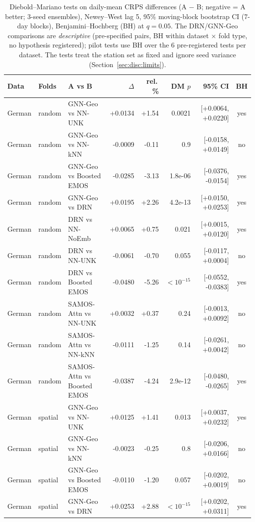 \begin{table}[!htbp]
\centering
\caption{Diebold--Mariano tests on daily-mean CRPS differences (A $-$ B; negative = A better; 3-seed ensembles), Newey--West lag 5, 95\% moving-block bootstrap CI (7-day blocks), Benjamini--Hochberg (BH) at $q=0.05$. The DRN/GNN-Geo comparisons are \emph{descriptive} (pre-specified pairs, BH within dataset $\times$ fold type, no hypothesis registered); pilot tests use BH over the 6 pre-registered tests per dataset. The tests treat the station set as fixed and ignore seed variance (Section~\ref{sec:disc:limits}).}
\label{tab:tests}
\scriptsize
\begin{tabular}{lllrrrrc}
\toprule
Data & Folds & A vs B & $\Delta$ & rel.\,\% & DM $p$ & 95\% CI & BH \\
\midrule
German & random & GNN-Geo vs NN-UNK & +0.0134 & +1.54 & 0.0021 & [+0.0064, +0.0220] & yes \\
German & random & GNN-Geo vs NN-kNN & -0.0009 & -0.11 & 0.9 & [-0.0158, +0.0149] & no \\
German & random & GNN-Geo vs Boosted EMOS & -0.0285 & -3.13 & 1.8e-06 & [-0.0376, -0.0154] & yes \\
German & random & GNN-Geo vs DRN & +0.0195 & +2.26 & 4.2e-13 & [+0.0150, +0.0253] & yes \\
German & random & DRN vs NN-NoEmb & +0.0065 & +0.75 & 0.021 & [+0.0015, +0.0120] & yes \\
German & random & DRN vs NN-UNK & -0.0061 & -0.70 & 0.055 & [-0.0117, +0.0004] & no \\
German & random & DRN vs Boosted EMOS & -0.0480 & -5.26 & $<10^{-15}$ & [-0.0552, -0.0383] & yes \\
German & random & SAMOS-Attn vs NN-UNK & +0.0032 & +0.37 & 0.24 & [-0.0013, +0.0092] & no \\
German & random & SAMOS-Attn vs NN-kNN & -0.0111 & -1.25 & 0.14 & [-0.0261, +0.0042] & no \\
German & random & SAMOS-Attn vs Boosted EMOS & -0.0387 & -4.24 & 2.9e-12 & [-0.0480, -0.0265] & yes \\
\addlinespace
German & spatial & GNN-Geo vs NN-UNK & +0.0125 & +1.41 & 0.013 & [+0.0037, +0.0232] & yes \\
German & spatial & GNN-Geo vs NN-kNN & -0.0023 & -0.25 & 0.8 & [-0.0206, +0.0166] & no \\
German & spatial & GNN-Geo vs Boosted EMOS & -0.0110 & -1.20 & 0.057 & [-0.0202, +0.0019] & no \\
German & spatial & GNN-Geo vs DRN & +0.0253 & +2.88 & $<10^{-15}$ & [+0.0202, +0.0311] & yes \\

\end{tabular}
\end{table}

